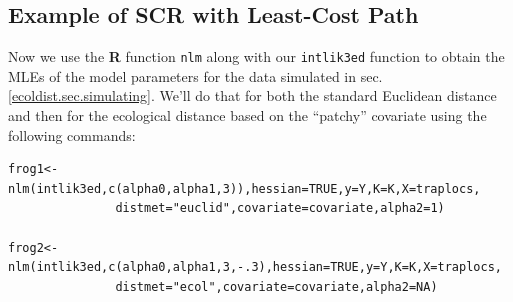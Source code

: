 \subsection{Example of SCR with Least-Cost Path}

Now we use the {\bf R} function \mbox{\tt nlm} along with
our \mbox{\tt intlik3ed} function to  obtain the MLEs of the
model parameters for the data simulated
in sec. \ref{ecoldist.sec.simulating}.
 We'll do that for both the standard Euclidean distance
and then for the ecological distance based on the ``patchy''
covariate using the following commands:
{\small
 \begin{verbatim}
frog1<-nlm(intlik3ed,c(alpha0,alpha1,3)),hessian=TRUE,y=Y,K=K,X=traplocs,
               distmet="euclid",covariate=covariate,alpha2=1)

frog2<-nlm(intlik3ed,c(alpha0,alpha1,3,-.3),hessian=TRUE,y=Y,K=K,X=traplocs,
               distmet="ecol",covariate=covariate,alpha2=NA)
\end{verbatim}
}

